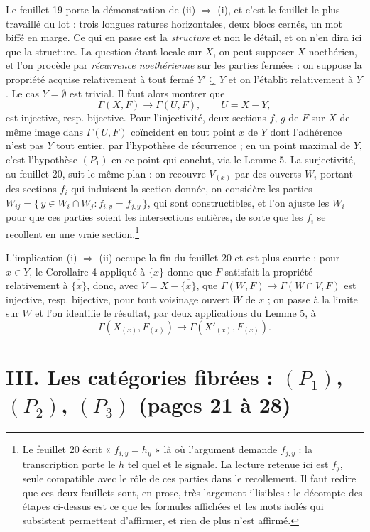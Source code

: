\documentclass[11pt,a4paper]{article}
\begin{document}
Le feuillet 19 porte la démonstration de (ii) $\Rightarrow$ (i), et c'est le
feuillet le plus travaillé du lot : trois longues ratures horizontales, deux
blocs cernés, un mot biffé en marge. Ce qui en passe est la \emph{structure} et
non le détail, et on n'en dira ici que la structure. La question étant locale
sur $X$, on peut supposer $X$ noethérien, et l'on procède par \emph{récurrence
noethérienne} sur les parties fermées : on suppose la propriété acquise
relativement à tout fermé $Y' \subsetneq Y$ et on l'établit relativement à $Y$.
Le cas $Y = \emptyset$ est trivial. Il faut alors montrer que
\[
  \Gamma(X,F) \longrightarrow \Gamma(U,F) , \qquad U = X - Y ,
\]
est injective, resp. bijective. Pour l'injectivité, deux sections $f$, $g$ de
$F$ sur $X$ de même image dans $\Gamma(U,F)$ coïncident en tout point $x$ de $Y$
dont l'adhérence n'est pas $Y$ tout entier, par l'hypothèse de récurrence ; en
un point maximal de $Y$, c'est l'hypothèse $(P_{1})$ en ce point qui conclut, via
le Lemme 5. La surjectivité, au feuillet 20, suit le même plan : on recouvre
$V_{(x)}$ par des ouverts $W_{i}$ portant des sections $f_{i}$ qui induisent la
section donnée, on considère les parties
$W_{ij} = \{\, y \in W_{i} \cap W_{j} : f_{i,y} = f_{j,y} \,\}$, qui sont
constructibles, et l'on ajuste les $W_{i}$ pour que ces parties soient les
intersections entières, de sorte que les $f_{i}$ se recollent en une vraie
section.\footnote{Le feuillet 20 écrit « $f_{i,y} = h_{y}$ » là où l'argument
demande $f_{j,y}$ : la transcription porte le $h$ tel quel et le signale. La
lecture retenue ici est $f_{j}$, seule compatible avec le rôle de ces parties
dans le recollement. Il faut redire que ces deux feuillets sont, en prose, très
largement illisibles : le décompte des étapes ci-dessus est ce que les formules
affichées et les mots isolés qui subsistent permettent d'affirmer, et rien de
plus n'est affirmé.}

L'implication (i) $\Rightarrow$ (ii) occupe la fin du feuillet 20 et est plus
courte : pour $x \in Y$, le Corollaire 4 appliqué à $\overline{\{x\}}$ donne que
$F$ satisfait la propriété relativement à $\overline{\{x\}}$, donc, avec
$V = X - \overline{\{x\}}$, que $\Gamma(W,F) \to \Gamma(W \cap V, F)$ est
injective, resp. bijective, pour tout voisinage ouvert $W$ de $x$ ; on passe à
la limite sur $W$ et l'on identifie le résultat, par deux applications du
Lemme 5, à
\[
  \Gamma(X_{(x)}, F_{(x)}) \longrightarrow \Gamma(X'_{(x)}, F_{(x)}) .
\]

\section*{III. Les catégories fibrées : $(P_1)$, $(P_2)$, $(P_3)$ (pages 21 à 28)}
\end{document}
